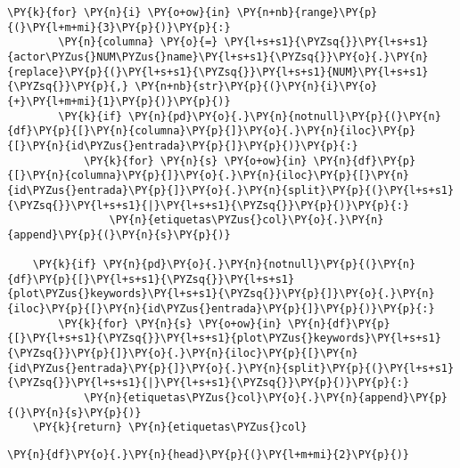 \begin{tcolorbox}[breakable, size=fbox, boxrule=1pt, pad at break*=1mm,colback=cellbackground, colframe=cellborder]
\begin{Verbatim}[commandchars=\\\{\}]
    \PY{k}{for} \PY{n}{i} \PY{o+ow}{in} \PY{n+nb}{range}\PY{p}{(}\PY{l+m+mi}{3}\PY{p}{)}\PY{p}{:}
        \PY{n}{columna} \PY{o}{=} \PY{l+s+s1}{\PYZsq{}}\PY{l+s+s1}{actor\PYZus{}NUM\PYZus{}name}\PY{l+s+s1}{\PYZsq{}}\PY{o}{.}\PY{n}{replace}\PY{p}{(}\PY{l+s+s1}{\PYZsq{}}\PY{l+s+s1}{NUM}\PY{l+s+s1}{\PYZsq{}}\PY{p}{,} \PY{n+nb}{str}\PY{p}{(}\PY{n}{i}\PY{o}{+}\PY{l+m+mi}{1}\PY{p}{)}\PY{p}{)}
        \PY{k}{if} \PY{n}{pd}\PY{o}{.}\PY{n}{notnull}\PY{p}{(}\PY{n}{df}\PY{p}{[}\PY{n}{columna}\PY{p}{]}\PY{o}{.}\PY{n}{iloc}\PY{p}{[}\PY{n}{id\PYZus{}entrada}\PY{p}{]}\PY{p}{)}\PY{p}{:}
            \PY{k}{for} \PY{n}{s} \PY{o+ow}{in} \PY{n}{df}\PY{p}{[}\PY{n}{columna}\PY{p}{]}\PY{o}{.}\PY{n}{iloc}\PY{p}{[}\PY{n}{id\PYZus{}entrada}\PY{p}{]}\PY{o}{.}\PY{n}{split}\PY{p}{(}\PY{l+s+s1}{\PYZsq{}}\PY{l+s+s1}{|}\PY{l+s+s1}{\PYZsq{}}\PY{p}{)}\PY{p}{:}
                \PY{n}{etiquetas\PYZus{}col}\PY{o}{.}\PY{n}{append}\PY{p}{(}\PY{n}{s}\PY{p}{)}
                
    \PY{k}{if} \PY{n}{pd}\PY{o}{.}\PY{n}{notnull}\PY{p}{(}\PY{n}{df}\PY{p}{[}\PY{l+s+s1}{\PYZsq{}}\PY{l+s+s1}{plot\PYZus{}keywords}\PY{l+s+s1}{\PYZsq{}}\PY{p}{]}\PY{o}{.}\PY{n}{iloc}\PY{p}{[}\PY{n}{id\PYZus{}entrada}\PY{p}{]}\PY{p}{)}\PY{p}{:}
        \PY{k}{for} \PY{n}{s} \PY{o+ow}{in} \PY{n}{df}\PY{p}{[}\PY{l+s+s1}{\PYZsq{}}\PY{l+s+s1}{plot\PYZus{}keywords}\PY{l+s+s1}{\PYZsq{}}\PY{p}{]}\PY{o}{.}\PY{n}{iloc}\PY{p}{[}\PY{n}{id\PYZus{}entrada}\PY{p}{]}\PY{o}{.}\PY{n}{split}\PY{p}{(}\PY{l+s+s1}{\PYZsq{}}\PY{l+s+s1}{|}\PY{l+s+s1}{\PYZsq{}}\PY{p}{)}\PY{p}{:}
            \PY{n}{etiquetas\PYZus{}col}\PY{o}{.}\PY{n}{append}\PY{p}{(}\PY{n}{s}\PY{p}{)}
    \PY{k}{return} \PY{n}{etiquetas\PYZus{}col}
\end{Verbatim}
\end{tcolorbox}

    \begin{tcolorbox}[breakable, size=fbox, boxrule=1pt, pad at break*=1mm,colback=cellbackground, colframe=cellborder]
\begin{Verbatim}[commandchars=\\\{\}]
\PY{n}{df}\PY{o}{.}\PY{n}{head}\PY{p}{(}\PY{l+m+mi}{2}\PY{p}{)}
\end{Verbatim}
\end{tcolorbox}

